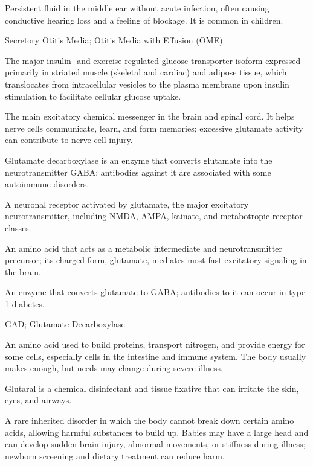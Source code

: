  Persistent fluid in the middle ear without acute infection, often causing conductive hearing loss and a feeling of blockage. It is common in children.

\synonyms
Secretory Otitis Media; Otitis Media with Effusion (OME)

 The major insulin- and exercise-regulated glucose transporter isoform expressed primarily in striated muscle (skeletal and cardiac) and adipose tissue, which translocates from intracellular vesicles to the plasma membrane upon insulin stimulation to facilitate cellular glucose uptake.

 The main excitatory chemical messenger in the brain and spinal cord. It helps nerve cells communicate, learn, and form memories; excessive glutamate activity can contribute to nerve-cell injury.

 Glutamate decarboxylase is an enzyme that converts glutamate into the neurotransmitter GABA; antibodies against it are associated with some autoimmune disorders.

 A neuronal receptor activated by glutamate, the major excitatory neurotransmitter, including NMDA, AMPA, kainate, and metabotropic receptor classes.

 An amino acid that acts as a metabolic intermediate and neurotransmitter precursor; its charged form, glutamate, mediates most fast excitatory signaling in the brain.

 An enzyme that converts glutamate to GABA; antibodies to it can occur in type 1 diabetes.

\synonyms
GAD; Glutamate Decarboxylase

 An amino acid used to build proteins, transport nitrogen, and provide energy for some cells, especially cells in the intestine and immune system. The body usually makes enough, but needs may change during severe illness.

 Glutaral is a chemical disinfectant and tissue fixative that can irritate the skin, eyes, and airways.

 A rare inherited disorder in which the body cannot break down certain amino acids, allowing harmful substances to build up. Babies may have a large head and can develop sudden brain injury, abnormal movements, or stiffness during illness; newborn screening and dietary treatment can reduce harm.

